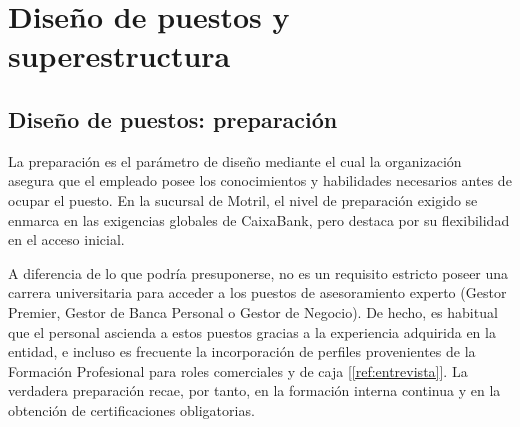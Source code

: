 
\chapter{Diseño de puestos y superestructura}

\section{Diseño de puestos: preparación}

%

La preparación es el parámetro de diseño mediante el cual la organización asegura que el empleado posee los conocimientos y habilidades necesarios antes de ocupar el puesto. En la sucursal de Motril, el nivel de preparación exigido se enmarca en las exigencias globales de CaixaBank, pero destaca por su flexibilidad en el acceso inicial.

A diferencia de lo que podría presuponerse, no es un requisito estricto poseer una carrera universitaria para acceder a los puestos de asesoramiento experto (Gestor Premier, Gestor de Banca Personal o Gestor de Negocio). De hecho, es habitual que el personal ascienda a estos puestos gracias a la experiencia adquirida en la entidad, e incluso es frecuente la incorporación de perfiles provenientes de la Formación Profesional para roles comerciales y de caja [\ref{ref:entrevista}]. La verdadera preparación recae, por tanto, en la formación interna continua y en la obtención de certificaciones obligatorias.

